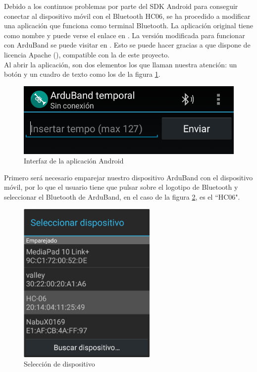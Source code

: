 Debido a los continuos problemas por parte del SDK Android para conseguir conectar
al dispositivo móvil con el Bluetooth HC06, se ha procedido a modificar una aplicación
que funciona como terminal Bluetooth. La aplicación original tiene como nombre y puede verse
el enlace en \cite{bluetoothOrigin}. La versión modificada para funcionar con ArduBand se
puede visitar en \cite{bluetoothProvisional}. Esto se puede hacer gracias a que \cite{bluetoothOrigin}
dispone de licencia Apache (\cite{apacheLicense}), compatible con la de este proyecto.\\

Al abrir la aplicación, son dos elementos los que llaman nuestra atención: un botón y un cuadro
de texto como los de la figura \ref{fig:protoand1}.

\begin{figure}[!htb]
\centering
\includegraphics[width=1\textwidth]{./imagenes/arduband-android-prototipo1}
\caption{Interfaz de la aplicación Android} \label{fig:protoand1}
\end{figure}

Primero será necesario emparejar nuestro dispositivo ArduBand con el dispositivo
móvil, por lo que el usuario tiene que pulsar sobre el logotipo de Bluetooth y seleccionar
el Bluetooth de ArduBand, en el caso de la figura \ref{fig:protoand2}, es el ``HC06".

\begin{figure}[!htb]
\centering
\includegraphics[width=0.6\textwidth]{./imagenes/arduband-android-prototipo2}
\caption{Selección de dispositivo} \label{fig:protoand2}
\end{figure}

